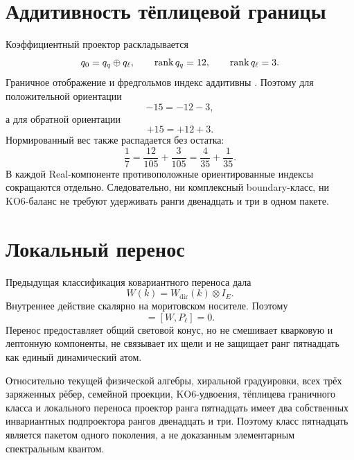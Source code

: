 \section{Аддитивность тёплицевой границы}

Коэффициентный проектор раскладывается
\begin{equation}
 q_0=q_q\oplus q_\ell,
 \qquad
 \operatorname{rank} q_q=12,
 \qquad
 \operatorname{rank} q_\ell=3.
\end{equation}
Граничное отображение и фредгольмов индекс аддитивны
\cite{minimal-support-pimsner-voiculescu1980}. Поэтому для положительной
ориентации
\begin{equation}
 -15=-12-3,
\end{equation}
а для обратной ориентации
\begin{equation}
 +15=+12+3.
\end{equation}
Нормированный вес также распадается без остатка:
\begin{equation}
 \frac17=\frac{12}{105}+\frac{3}{105}
 =\frac4{35}+\frac1{35}.
\end{equation}
В каждой Real-компоненте противоположные ориентированные индексы
сокращаются отдельно. Следовательно, ни комплексный boundary-класс, ни
KO6-баланс не требуют удерживать ранги двенадцать и три в одном пакете.

\section{Локальный перенос}

Предыдущая классификация ковариантного переноса дала
\begin{equation}
 W(k)=W_{\mathrm{dir}}(k)\otimes I_E.
\end{equation}
Внутреннее действие скалярно на моритовском носителе. Поэтому
\begin{equation}
 [W,P_q]=[W,P_\ell]=0.
\end{equation}
Перенос предоставляет общий световой конус, но не смешивает кварковую и
лептонную компоненты, не связывает их щели и не защищает ранг пятнадцать
как единый динамический атом.

\begin{theorem}
Относительно текущей физической алгебры, хиральной градуировки, всех трёх
заряженных рёбер, семейной проекции, KO6-удвоения, тёплицева граничного
класса и локального переноса проектор ранга пятнадцать имеет два
собственных инвариантных подпроектора рангов двенадцать и три. Поэтому
класс пятнадцать является пакетом одного поколения, а не доказанным
элементарным спектральным квантом.
\end{theorem}

